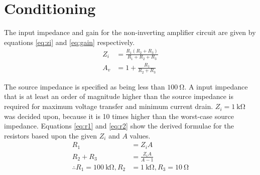 \section{Conditioning}
\label{ap:conditioning}

The input impedance and gain for the non-inverting amplifier circuit are given by equations \ref{eq:zi} and \ref{eq:gain} respectively.
\begin{align}
	Z_i &= \frac{R_1 (R_2 + R_3)}{R_1 + R_2 + R_3} \label{eq:zi} \\
	A_v &= 1 + \frac{R_1}{R_2 + R_3}\label{eq:gain}
\end{align}

The source impedance is specified as being less than $\SI{100}{\ohm}$.
A input impedance that is at least an order of magnitude higher than the source impedance is required for maximum voltage transfer and minimum current drain.
$Z_i = \SI{1}{\kilo\ohm}$ was decided upon, because it is 10 times higher than the worst-case source impedance.
Equations \ref{eq:r1} and \ref{eq:r2} show the derived formulae for the resistors based upon the given $Z_i$ and $A$ values.
\begin{align}
	R_1 &= Z_i A \label{eq:r1} \\
	R_2 + R_3 &= \frac{Z_i A}{A - 1} \label{eq:r2} \\[1em]
	\therefore R_1 = \SI{100}{\kilo\ohm}, R_2 &= \SI{1}{\kilo\ohm}, R_3 = \SI{10}{\ohm} \nonumber
\end{align}

